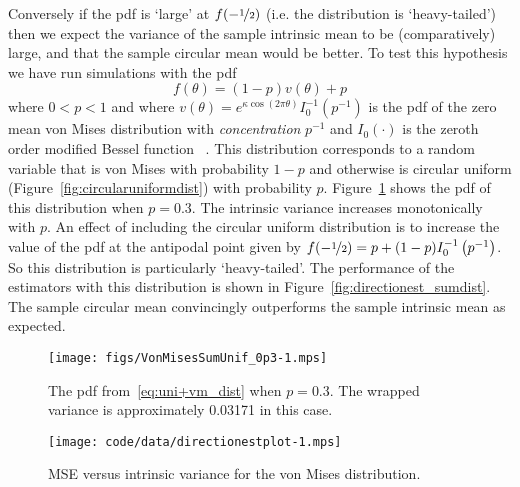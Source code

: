 \documentclass[journal]{IEEEtran}
\begin{document}
Conversely if the pdf is `large' at $f(-\nicefrac{1}{2})$  (i.e. the distribution is `heavy-tailed') then we expect the variance of the sample intrinsic mean to be (comparatively) large, and that the sample circular mean would be better. %
To test this hypothesis we have run simulations with the pdf
\begin{equation}\label{eq:uni+vm_dist}
f(\theta) = (1-p)v(\theta) + p
\end{equation}
where $0 < p < 1$ and where $v(\theta) = e^{\kappa\cos\left(2\pi \theta \right)}I_0^{-1}\left(p^{-1}\right)$ is the pdf of the zero mean von Mises distribution with \emph{concentration} $p^{-1}$ and $I_0(\cdot)$ is the zeroth order modified Bessel function \cite[Sec.~5.3]{McKilliam2010thesis}~\cite{Fisher1993,Mardia_directional_statistics}.  This distribution corresponds to a random variable that is von Mises with probability $1-p$ and otherwise is circular uniform (Figure~\ref{fig:circularuniformdist}) with probability $p$.  Figure~\ref{fig:pdf_sumunifvonmis} shows the pdf of this distribution when $p = 0.3$.  %
The intrinsic variance increases monotonically with $p$.  An effect of including the circular uniform distribution is to increase the value of the pdf at the antipodal point given by $f(-\nicefrac{1}{2}) = p + (1-p)I_0^{-1}\left(p^{-1}\right)$.  So this distribution is particularly `heavy-tailed'. The performance of the estimators with this distribution is shown in Figure~\ref{fig:directionest_sumdist}. The sample circular mean convincingly outperforms the sample intrinsic mean as expected.

\begin{figure}[tp]
	\centering
		\texttt{[image: figs/VonMisesSumUnif\_0p3-1.mps]}
		\caption{The pdf from~\eqref{eq:uni+vm_dist} when $p = 0.3$. The wrapped variance is approximately 0.03171 in this case.}
		\label{fig:pdf_sumunifvonmis}
\end{figure}

\begin{figure}[p]
	\centering
		\texttt{[image: code/data/directionestplot-1.mps]}
		\caption{MSE versus intrinsic variance for the von Mises distribution.}
		\label{fig:directionest_VonMises}
\end{figure}
\end{document}
